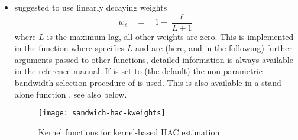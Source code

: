 \documentclass{Z}
\begin{document}
\begin{itemize}
\item \cite{hac:Newey+West:1987} suggested to use linearly decaying weights
\begin{equation} \label{eq:NeweyWest}
  w_\ell \quad = \quad 1 - \frac{\ell}{L + 1}
\end{equation}
where $L$ is the maximum lag, all other weights are zero. This is implemented in the
function  where  specifies $L$ and 
\code{\dots} are (here, and in the following) further arguments passed to other
functions, detailed information is always available in the reference manual.
If  is set to  (the default) the non-parametric bandwidth selection
procedure of \cite{hac:Newey+West:1994} is used. This is also available in a stand-alone
function , see also below.

\begin{figure}[tbh]
\begin{center}
\texttt{[image: sandwich-hac-kweights]}
\caption{\label{fig:kweights} Kernel functions for kernel-based HAC estimation}
\end{center}
\end{figure}


\end{itemize}
\end{document}
